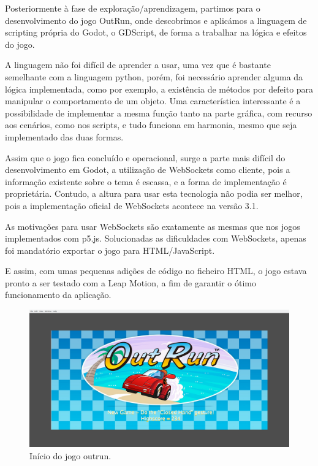 \documentclass{TTUPhD}
\begin{document}
Posteriormente à fase de exploração/aprendizagem, partimos para o desenvolvimento do jogo OutRun, onde descobrimos e aplicámos a linguagem de scripting própria do Godot,
o GDScript, de forma a trabalhar na lógica e efeitos do jogo.

A linguagem não foi difícil de aprender a usar, uma vez que é bastante semelhante com a linguagem python, porém, foi necessário aprender alguma da lógica implementada, como por exemplo, a existência de métodos por defeito para manipular o comportamento de um objeto. Uma característica interessante é a possibilidade de implementar a mesma função tanto na parte gráfica, com recurso aos cenários, como nos scripts, e tudo funciona em harmonia, mesmo que seja implementado das duas formas.

Assim que o jogo fica concluído e operacional, surge a parte mais difícil do desenvolvimento em Godot, a utilização de WebSockets como cliente, pois a informação existente sobre o tema é escassa, e a forma de implementação é proprietária. Contudo, a altura para usar esta tecnologia não podia ser melhor, pois a implementação oficial de WebSockets acontece na versão 3.1.

As motivações para usar WebSockets são exatamente as mesmas que nos jogos implementados com p5.js.
Solucionadas as dificuldades com WebSockets, apenas foi mandatório exportar o jogo para HTML/JavaScript.

E assim, com umas pequenas adições de código no ficheiro HTML, o jogo estava pronto a ser testado com a Leap Motion, a fim de garantir o ótimo funcionamento da aplicação.

\begin{figure}[h!]
    \center
    \includegraphics[scale=0.25]{./img/OutRun.png}
    \caption{Início do jogo outrun.}
    \label{fig:outrun}
\end{figure}
\end{document}

